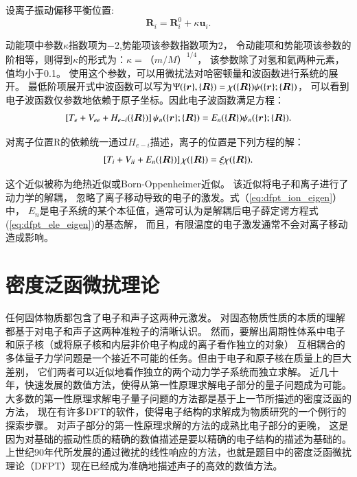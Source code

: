 设离子振动偏移平衡位置:
\begin{equation}
  \bm{R}_i = \bm{R}^0_i + \kappa \bm{u}_i .
\end{equation}

动能项中参数$\kappa$指数项为\num{-2},势能项该参数指数项为\num{2}，
令动能项和势能项该参数的阶相等，则得到$\kappa$的形式为：$\kappa=（m/M）^{1/4}$，
该参数除了对氢和氦两种元素，值均小于\num{0.1}。
使用这个参数，可以用微扰法对哈密顿量和波函数进行系统的展开。
最低阶项展开式中波函数可以写为$\Psi(\{\bm{r}\},\{\bm{R}\})=\chi(\{\bm{R}\})\psi(\{\bm{r}\};\{\bm{R}\})$，
可以看到电子波函数仅参数地依赖于原子坐标。因此电子波函数满足方程：
\begin{equation}\label{eq:dfpt_ele_eigen}
  \left[ T_e + V_{ee} + H_{e-i}(\{\bm{R}\}) \right]\psi_n(\{\bm{r}\};\{\bm{R}\}) = E_n(\{\bm{R}\})\psi_n(\{\bm{r}\}; \{\bm{R}\}) .
\end{equation}

对离子位置R的依赖统一通过$H_{e-i}$描述，离子的位置是下列方程的解：
\begin{equation}\label{eq:dfpt_ion_eigen}
  \left[ T_i + V_{ii} + E_n(\{\bm{R}\}) \right] \chi(\{\bm{R}\}) = \xi \chi(\{\bm{R}\}) .
\end{equation}

这个近似被称为绝热近似或Born-Oppenheimer近似。
该近似将电子和离子进行了动力学的解耦，
忽略了离子移动导致的电子的激发。式（\ref{eq:dfpt_ion_eigen}）中，
$E_n$是电子系统的某个本征值，通常可认为是解耦后电子薛定谔方程式(\ref{eq:dfpt_ele_eigen})的基态解，
而且，有限温度的电子激发通常不会对离子移动造成影响。

\section{密度泛函微扰理论}

任何固体物质都包含了电子和声子这两种元激发。
对固态物质性质的本质的理解都基于对电子和声子这两种准粒子的清晰认识。
然而，要解出周期性体系中电子和原子核（或将原子核和内层非价电子构成的离子看作独立的对象）
互相耦合的多体量子力学问题是一个接近不可能的任务。但由于电子和原子核在质量上的巨大差别，
它们两者可以近似地看作独立的两个动力学子系统而独立求解。
近几十年，快速发展的数值方法，使得从第一性原理求解电子部分的量子问题成为可能。
大多数的第一性原理求解电子量子问题的方法都是基于上一节所描述的密度泛函的方法，
现在有许多DFT的软件，使得电子结构的求解成为物质研究的一个例行的探索步骤。
对声子部分的第一性原理求解的方法的成熟比电子部分的更晚，
这是因为对基础的振动性质的精确的数值描述是要以精确的电子结构的描述为基础的。
上世纪90年代所发展的通过微扰的线性响应的方法，也就是题目中的密度泛函微扰理论（DFPT）现在已经成为准确地描述声子的高效的数值方法。


